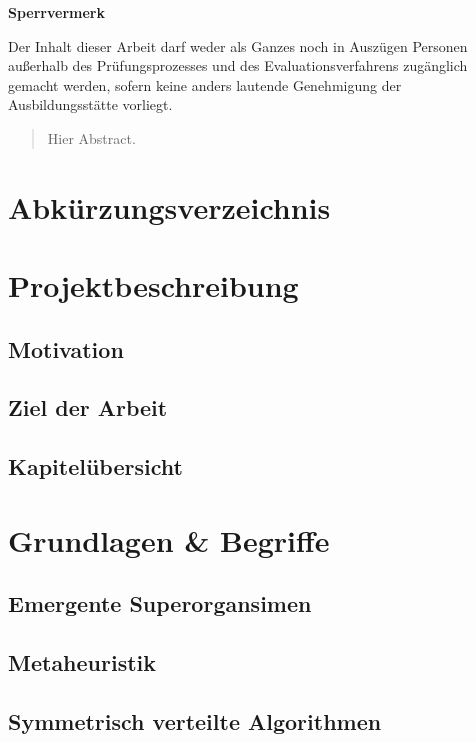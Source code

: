 \documentclass[a4paper, 11pt]{article}
\makeatletter
\newcommand*{\maintoc}{%
	\begingroup
	\@fileswfalse%
	\renewcommand*{\appendixattoc}{%
		\value{tocdepth}=-10000 %
	}%
	\tableofcontents%
	\endgroup
}
\newcommand*{\appendixattoc}{%
}
\makeatother
\begin{document}
\newpage
\begin{framed}
	\begin{center}
		\Large\bfseries Sperrvermerk
	\end{center}
	\medskip
	\noindent
	Der Inhalt dieser Arbeit darf weder als Ganzes noch in Auszügen Personen
	außerhalb des Prüfungsprozesses und des Evaluationsverfahrens zugänglich gemacht
	werden, sofern keine anders lautende Genehmigung der Ausbildungsstätte vorliegt.
\end{framed}
\newpage
{} 
\begin{abstract}
Hier Abstract.
\end{abstract}
\newpage
\maintoc           %
\newpage
\listoffigures             %
\newpage
\listoftables              %
\newpage
\section*{\Large \textbf Abkürzungsverzeichnis}  
\begin{acronym}[Bash]
\end{acronym}
\newpage
{} 
\section{Projektbeschreibung}
\subsection{Motivation}
\subsection{Ziel der Arbeit}
\subsection{Kapitelübersicht}
\section{Grundlagen \& Begriffe}
\subsection{Emergente Superorgansimen}
\subsection{Metaheuristik}
\subsection{Symmetrisch verteilte Algorithmen}
\end{document}
